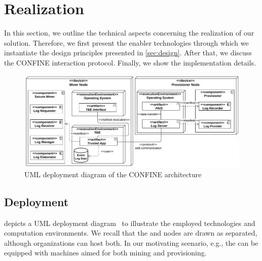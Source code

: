 \section{Realization}
\label{sec:realization}
In this section, we outline the technical aspects concerning the realization of our solution. Therefore, we first present the enabler technologies through which we instantiate the design principles presented in \cref{sec:design}. After that, we discuss the CONFINE interaction protocol. Finally, we show the implementation details.

%
\begin{figure}[t]
	\centering
	\includegraphics[width=1\linewidth]{content/figures/deploymentdiagram.pdf}
	\caption{UML deployment diagram of the CONFINE architecture}
	\label{fig:deployment_diagram}
\end{figure}
%
\subsection{Deployment}
\label{sec:deployment}
%
 depicts a UML deployment diagram~\cite{koch2002expressive} to illustrate the employed technologies and computation environments. %
We recall that the  and  nodes are drawn as separated, although organizations can host both.
In our motivating scenario, e.g., the  can be equipped with machines aimed for both mining and provisioning. %

